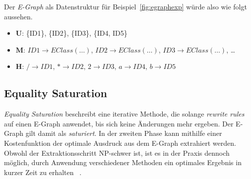 Der \textit{E-Graph} als Datenstruktur für Beispiel~\ref{fig:egraphexp} würde also wie folgt aussehen.

\begin{itemize}
  \item $\mathbf{U}$: \{ID1\}, \{ID2\}, \{ID3\}, \{ID4, ID5\} 
  \item $\mathbf{M}$: $ID1 \rightarrow EClass(\ldots)$, $ID2 \rightarrow EClass(\ldots)$, $ID3 \rightarrow EClass(\ldots)$, \ldots 
  \item $\mathbf{H}$: $/ \rightarrow ID1$, $* \rightarrow ID2$, $2 \rightarrow ID3$, $a \rightarrow ID4$, $b \rightarrow ID5$
\end{itemize}



\subsection{Equality Saturation}

\textit{Equality Saturation} beschreibt eine iterative Methode, die solange \textit{rewrite rules} auf einen E-Graph anwendet, bis sich keine Änderungen mehr ergeben. 
Der E-Graph gilt damit als \textit{saturiert}.
In der zweiten Phase kann mithilfe einer Kostenfunktion der optimale Ausdruck aus dem E-Graph extrahiert werden.
Obwohl der Extraktionsschritt NP-schwer ist, ist es in der Praxis dennoch möglich, durch Anwendung verschiedener Methoden ein optimales Ergebnis in kurzer Zeit zu erhalten
~\cite{phaseorder-2009}. 
